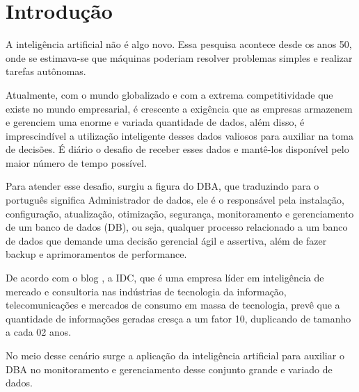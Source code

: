 \chapter{Introdução}

A inteligência artificial não é algo novo. Essa pesquisa acontece desde os anos 50, onde se estimava-se que máquinas poderiam resolver problemas simples e realizar tarefas autônomas.


Atualmente, com o mundo globalizado e com a extrema competitividade que existe no mundo empresarial, é crescente a exigência que as empresas armazenem e gerenciem uma enorme e variada quantidade de dados, além disso, é imprescindível a utilização inteligente desses dados valiosos para auxiliar na toma de decisões. É diário o desafio de receber esses dados e mantê-los disponível pelo maior número de tempo possível. 


Para atender esse desafio, surgiu a figura do DBA, que traduzindo para o português significa Administrador de dados, ele é o responsável pela instalação, configuração, atualização, otimização, segurança, monitoramento e gerenciamento de um banco de dados (DB), ou seja, qualquer processo relacionado a um banco de dados que demande uma decisão gerencial ágil e assertiva, além de fazer backup e aprimoramentos de performance.


De acordo com o blog \cite{OracleBlog}, a IDC, que é uma empresa líder em inteligência de mercado e consultoria nas indústrias de tecnologia da informação, telecomunicações e mercados de consumo em massa de tecnologia, prevê que a quantidade de informações geradas cresça a um fator 10, duplicando de tamanho a cada 02 anos.


No meio desse cenário surge a aplicação da inteligência artificial para auxiliar o DBA no monitoramento e gerenciamento desse conjunto grande e variado de dados.